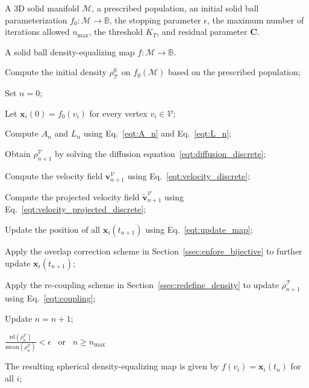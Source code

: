 \documentclass{article}
\begin{document}
\begin{algorithm}[h]
\caption{Bijective solid ball density-equalizing map}
\label{alg:3ddem}
  \begin{algorithmic}[1]
    \Require A 3D solid manifold $\mathcal{M}$, a prescribed population, an initial solid ball parameterization $f_0:\mathcal{M} \to \mathbb{B}$, the stopping parameter $\epsilon$, the maximum number of iterations allowed $n_{\max}$, the threshold $K_T$, and residual parameter $\mathbf{C}$.

    \Ensure A solid ball density-equalizing map $f:\mathcal{M}\to \mathbb{B}$.

\State Compute the initial density $\rho^0_{\mathcal{T}}$ on $f_0(\mathcal{M})$ based on the prescribed population;

\State Set $n = 0$;

\State Let $\mathbf{x}_i(0) = f_0(v_i)$  for every vertex $v_i \in \mathcal{V}$;

\Repeat

\State Compute $A_n$ and $L_n$ using Eq.~\eqref{eqt:A_n} and Eq.~\eqref{eqt:L_n};

\State Obtain $\rho_{n+1}^{\mathcal{V}}$ by solving the diffusion equation~\eqref{eqt:diffusion_discrete};

\State Compute the velocity field ${\mathbf{v}}_{n+1}^{\mathcal{V}}$ using Eq.~\eqref{eqt:velocity_discrete};

\State Compute the projected velocity field $\widetilde{\mathbf{v}}_{n+1}^{\mathcal{V}}$ using Eq.~\eqref{eqt:velocity_projected_discrete};

\State Update the position of all $\mathbf{x}_i (t_{n+1})$ using Eq.~\eqref{eqt:update_map};



 

\State Apply the overlap correction scheme in Section~\ref{ssec:enfore_bijective} to further update $\mathbf{x}_i(t_{n+1})$;

\State Apply the re-coupling scheme in Section~\ref{ssec:redefine_density} to update $\rho_{n+1}^{\mathcal{T}}$ using Eq.~\eqref{eqt:coupling};

\State Update $n = n + 1$;

\Until $\frac{\text{sd}\left(\rho_{n}^{\mathcal{V}}\right)}{\text{mean}\left(\rho_{n}^{\mathcal{V}}\right)} < \epsilon$ \ or \ $n \geq n_{\max}$

\State The resulting spherical density-equalizing map is given by $f(v_i) = \mathbf{x}_i(t_n)$ for all $i$;

  \end{algorithmic}
\end{algorithm}
\end{document}
